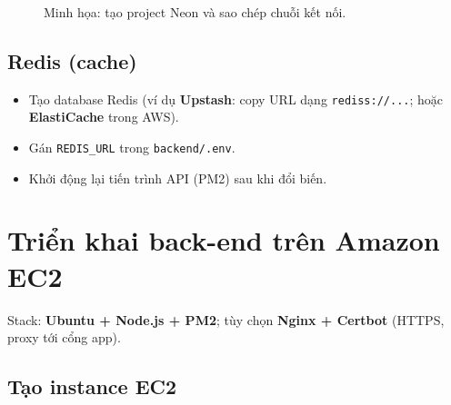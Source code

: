 \begin{figure}[H]
\centering
\caption{Minh họa: tạo project Neon và sao chép chuỗi kết nối.}
\label{fig:deploy-neon}
\end{figure}

\subsection{Redis (cache)}

\begin{itemize}
    \item Tạo database Redis (ví dụ \textbf{Upstash}: copy URL dạng \texttt{rediss://...}; hoặc \textbf{ElastiCache} trong AWS).
    \item Gán \texttt{REDIS\_URL} trong \texttt{backend/.env}.
    \item Khởi động lại tiến trình API (PM2) sau khi đổi biến.
\end{itemize}

\section{Triển khai back-end trên Amazon EC2}

Stack: \textbf{Ubuntu + Node.js + PM2}; tùy chọn \textbf{Nginx + Certbot} (HTTPS, proxy tới cổng app).

\subsection{Tạo instance EC2}

